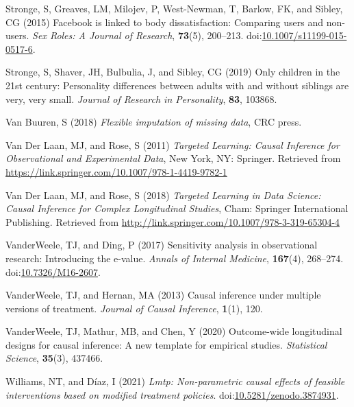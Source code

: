 \documentclass[
  singlecolumn]{article}
\newlength{\cslhangindent}
\newenvironment{CSLReferences}[2] %
 {\begin{list}{}{%
  \setlength{\itemindent}{0pt}
  \setlength{\leftmargin}{0pt}
  \setlength{\parsep}{0pt}
  \ifodd #1
   \setlength{\leftmargin}{\cslhangindent}
   \setlength{\itemindent}{-1\cslhangindent}
  \fi
  \setlength{\itemsep}{#2\baselineskip}}}
 {\end{list}}
\begin{document}
\begin{CSLReferences}{1}{0}
Stronge, S, Greaves, LM, Milojev, P, West-Newman, T, Barlow, FK, and
Sibley, CG (2015) Facebook is linked to body dissatisfaction: Comparing
users and non-users. \emph{Sex Roles: A Journal of Research},
\textbf{73}(5), 200--213.
doi:\href{https://doi.org/10.1007/s11199-015-0517-6}{10.1007/s11199-015-0517-6}.

Stronge, S, Shaver, JH, Bulbulia, J, and Sibley, CG (2019) Only children
in the 21st century: Personality differences between adults with and
without siblings are very, very small. \emph{Journal of Research in
Personality}, \textbf{83}, 103868.

Van Buuren, S (2018) \emph{Flexible imputation of missing data}, CRC
press.

Van Der Laan, MJ, and Rose, S (2011) \emph{Targeted Learning: Causal
Inference for Observational and Experimental Data}, New York, NY:
Springer. Retrieved from
\url{https://link.springer.com/10.1007/978-1-4419-9782-1}

Van Der Laan, MJ, and Rose, S (2018) \emph{Targeted Learning in Data
Science: Causal Inference for Complex Longitudinal Studies}, Cham:
Springer International Publishing. Retrieved from
\url{http://link.springer.com/10.1007/978-3-319-65304-4}

VanderWeele, TJ, and Ding, P (2017) Sensitivity analysis in
observational research: Introducing the e-value. \emph{Annals of
Internal Medicine}, \textbf{167}(4), 268--274.
doi:\href{https://doi.org/10.7326/M16-2607}{10.7326/M16-2607}.

VanderWeele, TJ, and Hernan, MA (2013) Causal inference under multiple
versions of treatment. \emph{Journal of Causal Inference},
\textbf{1}(1), 120.

VanderWeele, TJ, Mathur, MB, and Chen, Y (2020) Outcome-wide
longitudinal designs for causal inference: A new template for empirical
studies. \emph{Statistical Science}, \textbf{35}(3), 437466.

Williams, NT, and Díaz, I (2021) \emph{Lmtp: Non-parametric causal
effects of feasible interventions based on modified treatment policies}.
doi:\href{https://doi.org/10.5281/zenodo.3874931}{10.5281/zenodo.3874931}.

\end{CSLReferences}
\end{document}
